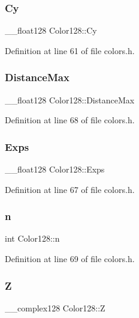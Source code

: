 \subsubsection{\texorpdfstring{Cy}{Cy}}
{\footnotesize\ttfamily \+\_\+\+\_\+float128 Color128\+::\+Cy}



Definition at line 61 of file colors.\+h.

\mbox{\label{struct_color128_ad5c9016be1b1895979d83fb0cf6b59b5}} 
\subsubsection{\texorpdfstring{Distance\+Max}{DistanceMax}}
{\footnotesize\ttfamily \+\_\+\+\_\+float128 Color128\+::\+Distance\+Max}



Definition at line 68 of file colors.\+h.

\mbox{\label{struct_color128_a3895ee8a70d847ed619c50b24c8302d1}} 
\subsubsection{\texorpdfstring{Exps}{Exps}}
{\footnotesize\ttfamily \+\_\+\+\_\+float128 Color128\+::\+Exps}



Definition at line 67 of file colors.\+h.

\mbox{\label{struct_color128_a75ba840a2e2fa86970dbbe43b2a6acff}} 
\subsubsection{\texorpdfstring{n}{n}}
{\footnotesize\ttfamily int Color128\+::n}



Definition at line 69 of file colors.\+h.

\mbox{\label{struct_color128_acffc1997afccd231603ea5af55ddf900}} 
\subsubsection{\texorpdfstring{Z}{Z}}
{\footnotesize\ttfamily \+\_\+\+\_\+complex128 Color128\+::Z}



